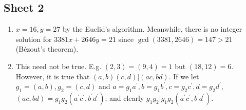 \documentclass[10pt, a4paper, twoside]{report}
\begin{document}
\subsection{Sheet 2}
\begin{enumerate}[{1.}]
    \item \(x=16,y=27\) by the Euclid's algorithm. Meanwhile, there is no integer solution for \(3381x+2646y=21\) since \(\gcd(3381,2646)=147>21\) (Bézout's theorem).
    \item This need not be true. E.g. \((2,3)=(9,4)=1\) but \((18,12)=6\). However, it is true that \((a,b)(c,d)|(ac,bd)\). If we let \(g_1=(a,b),g_2=(c,d)\) and \(a=g_1a^\prime,b=g_1b^\prime,c=g_2c^\prime,d=g_2d^\prime\), \((ac,bd)=g_1g_2(a^\prime c^\prime,b^\prime d^\prime)\); and clearly \(g_1g_2|g_1g_2(a^\prime c^\prime,b^\prime d^\prime)\).
    

\end{enumerate}
\end{document}
